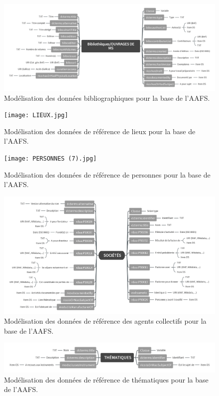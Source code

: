 \documentclass[a4paper,12pt,twoside]{book}
\begin{document}
 \begin{figure}[h]
    \centering
    \includegraphics[width=16cm]{Bibliothèques_Ouvrages de MS (1).jpg}
    \caption{Modélisation des données bibliographiques pour la base de l'AAFS.}
    \label{fig:enter-label}
\end{figure}

 \begin{figure}[h]
    \centering
    \texttt{[image: LIEUX.jpg]}
    \caption{Modélisation des données de référence de lieux pour la base de l'AAFS.}
    \label{fig:enter-label}
\end{figure}


 \begin{figure}[h]
    \centering
    \texttt{[image: PERSONNES (7).jpg]}
    \caption{Modélisation des données de référence de personnes pour la base de l'AAFS.}
    \label{fig:enter-label}
\end{figure}


 \begin{figure}[h]
    \centering
    \includegraphics[width=16cm]{SOCIÉTÉS (2).jpg}
    \caption{Modélisation des données de référence des agents collectifs pour la base de l'AAFS.}
    \label{fig:enter-label}
\end{figure}


 \begin{figure}[h]
    \centering
    \includegraphics[width=16cm]{THÉMATIQUES.jpg}
    \caption{Modélisation des données de référence de thématiques pour la base de l'AAFS.}
    \label{fig:enter-label}
\end{figure}
\end{document}
